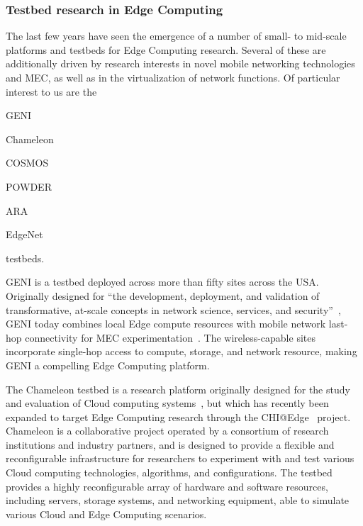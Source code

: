 \subsubsection{Testbed research in Edge Computing}

The last few years have seen the emergence of a number of small- to mid-scale platforms and testbeds for Edge Computing research.
Several of these are additionally driven by research interests in novel mobile networking technologies and \gls{MEC}, as well as in the virtualization of network functions.
Of particular interest to us are the
\begin{inlineenum}
    \item \acs{GENI}
    \item Chameleon
    \item \acs{COSMOS}
    \item \acs{POWDER}
    \item \acs{ARA}
    \item EdgeNet
\end{inlineenum} testbeds.

\gls{GENI} is a testbed deployed across more than fifty sites across the \gls{USA}.
Originally designed for ``the development, deployment, and validation of transformative, at-scale concepts in network science, services, and security''~\cite{berman2014geni}, \gls{GENI} today combines local Edge compute resources with mobile network last-hop connectivity for \gls{MEC} experimentation~\cite{gosain2017geni}.
The wireless-capable sites incorporate single-hop access to compute, storage, and network resource, making \gls{GENI} a compelling Edge Computing platform.

The Chameleon testbed is a research platform originally designed for the study and evaluation of Cloud computing systems~\cite{keahey2020lessons}, but which has recently been expanded to target Edge Computing research through the \acs{CHI}@Edge~\cite{chiatedge} project.
Chameleon is a collaborative project operated by a consortium of research institutions and industry partners, and is designed to provide a flexible and reconfigurable infrastructure for researchers to experiment with and test various Cloud computing technologies, algorithms, and configurations.
The testbed provides a highly reconfigurable array of hardware and software resources, including servers, storage systems, and networking equipment, able to simulate various Cloud and Edge Computing scenarios.

